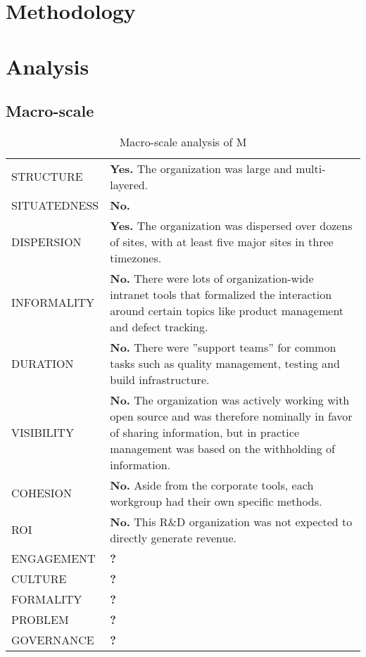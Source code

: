 \documentclass[
a4paper,
11pt,
parskip,
\MYLANGUAGE,
abstractoff,
bibliography=totoc
]{scrartcl}
\begin{document}
\section{Methodology}


\section{Analysis}

\subsection{Macro-scale}


\begin{table}[htbp]
\begin{center}
\begin{tabular}{lp{100mm}}
STRUCTURE & {\bf Yes.} The organization was large and multi-layered.\\
SITUATEDNESS & {\bf No.} \\
DISPERSION & {\bf Yes.} The organization was dispersed over dozens of sites, with at least five major sites in three timezones.\\
INFORMALITY & {\bf No.} There were lots of organization-wide intranet tools that formalized the interaction around certain topics like product management and defect tracking.\\
DURATION & {\bf No.} There were ''support teams'' for common tasks such as quality management, testing and build infrastructure.\\
VISIBILITY & {\bf No.} The organization was actively working with open source and was therefore nominally in favor of sharing information, but in practice management was based on the withholding of information. \\
COHESION & {\bf No.} Aside from the corporate tools, each workgroup had their own specific methods. \\
ROI & {\bf No.} This R{\&}D organization was not expected to directly generate revenue. \\
ENGAGEMENT & {\bf ?} \\
CULTURE & {\bf ?} \\
FORMALITY & {\bf ?} \\
PROBLEM & {\bf ?} \\
GOVERNANCE & {\bf ?} \\
\end{tabular}
\vspace{1em}
\caption{Macro-scale analysis of M}
\label{tab:macro1}
\end{center}
\end{table}
\end{document}
